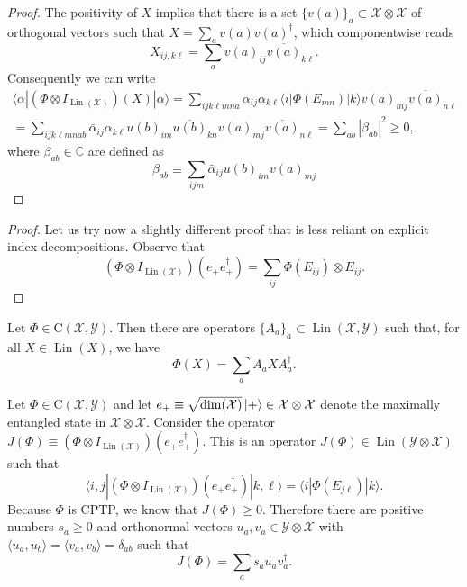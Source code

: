 \documentclass[12pt]{report}
\newcommand{\CC}{\mathbb{C}}
\newcommand{\calY}{{\mathcal{Y}}}
\newcommand{\calX}{{\mathcal{X}}}
\newcommand{\rmC}{{\mathrm{C}}}
\DeclareMathOperator{\Lin}{Lin}
\begin{document}
\begin{proof}
	The positivity of $X$ implies that there is a set $\{v(a)\}_a\subset\calX\otimes\calX$ of orthogonal vectors such that
	$X = \sum_a v(a) v(a)^\dagger$, which componentwise reads
	\begin{equation}
		X_{ij,k\ell} = \sum_a v(a)_{ij} \overline{v(a)}_{k\ell}.
	\end{equation}
	Consequently we can write
	\begin{equation}
	\begin{gathered}
		\langle \alpha| (\Phi\otimes I_{\Lin(\calX)})(X) |\alpha\rangle
		= \sum_{ijk\ell mn a} \bar\alpha_{ij} \alpha_{k\ell}
		\langle i|\Phi(E_{mn})|k\rangle v(a)_{mj} \overline{v(a)}_{n\ell} \\
		= \sum_{ijk\ell mn ab}
		\bar\alpha_{ij} \alpha_{k\ell}
		u(b)_{im} \overline{u(b)}_{kn}
		v(a)_{mj} \overline{v(a)}_{n\ell}
		= \sum_{ab} |\beta_{ab}|^2 \ge 0,
	\end{gathered}
	\end{equation}
	where $\beta_{ab}\in\CC$ are defined as
	\begin{equation}
		\beta_{ab} \equiv \sum_{ijm}
		\bar\alpha_{ij} u(b)_{im} v(a)_{mj}
	\end{equation}
\end{proof}

\begin{proof}
	Let us try now a slightly different proof that is less reliant on explicit index decompositions.
	Observe that
	\begin{equation}
		(\Phi\otimes I_{\Lin(\calX)})(e_+ e_+^\dagger)
		= \sum_{ij} \Phi(E_{ij}) \otimes E_{ij}.
	\end{equation}
\end{proof}


\begin{prop}
	Let $\Phi\in\rmC(\calX,\calY)$. Then there are operators $\{A_a\}_a\subset\Lin(\calX,\calY)$ such that, for all $X\in\Lin(X)$, we have
	\begin{equation}
		\Phi(X) = \sum_a A_a X A_a^\dagger.
	\end{equation}

\end{prop}

Let $\Phi\in\rmC(\calX,\calY)$ and let $e_+\equiv \sqrt{\dim(\calX)}\ket +\in\calX\otimes\calX$ denote the maximally entangled state in $\calX\otimes\calX$.
Consider the operator $J(\Phi)\equiv (\Phi\otimes I_{\Lin(\calX)})(e_+ e_+^\dagger)$.
This is an operator $J(\Phi)\in\Lin(\calY\otimes\calX)$ such that
\begin{equation}
	\langle i,j| (\Phi\otimes I_{\Lin(\calX)})(e_+ e_+^\dagger) |k,\ell\rangle
	= \langle i | \Phi(E_{j\ell}) | k\rangle.
\end{equation}
Because $\Phi$ is CPTP, we know that $J(\Phi)\ge0$.
Therefore there are positive numbers $s_a\ge0$ and orthonormal vectors $u_a,v_a\in\calY\otimes\calX$ with $\langle u_a,u_b\rangle=\langle v_a,v_b\rangle = \delta_{ab}$ such that
\begin{equation}
	J(\Phi) = \sum_a s_a u_a v_a^\dagger.
\end{equation}
\end{document}
